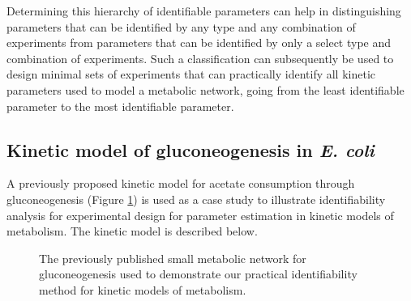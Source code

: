 \documentclass[10pt]{article}
\begin{document}
	Determining this hierarchy of identifiable parameters can help in distinguishing parameters that can be identified by any type and any combination of experiments from parameters that can be identified by only a select type and combination of experiments. Such a classification can subsequently be used to design minimal sets of experiments that can practically identify all kinetic parameters used to model a metabolic network, going from the least identifiable parameter to the most identifiable parameter.  	
	
	\subsection{Kinetic model of gluconeogenesis in \textit{E. coli}}\label{sec:small-model}
	A previously proposed kinetic model \parencite{Kotte2014, Srinivasan2017} for acetate consumption through gluconeogenesis (Figure \ref{fig:network}) is used as a case study to illustrate identifiability analysis for experimental design for parameter estimation in kinetic models of metabolism. The kinetic model is described below.
	
	\begin{figure}[!tbhp]
		\caption{The previously published small metabolic network for gluconeogenesis used to demonstrate our practical identifiability method for kinetic models of metabolism.}\label{fig:network}
	\end{figure}		
	
\end{document}
